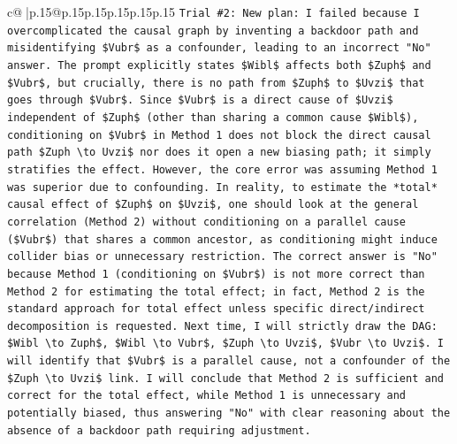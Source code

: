 \documentclass{article}
\begin{document}
{\begin{supertabular}{c@{$\;$}|p{.15\linewidth}@{}p{.15\linewidth}p{.15\linewidth}p{.15\linewidth}p{.15\linewidth}p{.15\linewidth}}
{{{\texttt{Trial \#2: New plan: I failed because I overcomplicated the causal graph by inventing a backdoor path and misidentifying \$Vubr\$ as a confounder, leading to an incorrect "No" answer. The prompt explicitly states \$Wibl\$ affects both \$Zuph\$ and \$Vubr\$, but crucially, there is no path from \$Zuph\$ to \$Uvzi\$ that goes through \$Vubr\$. Since \$Vubr\$ is a direct cause of \$Uvzi\$ independent of \$Zuph\$ (other than sharing a common cause \$Wibl\$), conditioning on \$Vubr\$ in Method 1 does not block the direct causal path \$Zuph \textbackslash{}to Uvzi\$ nor does it open a new biasing path; it simply stratifies the effect. However, the core error was assuming Method 1 was superior due to confounding. In reality, to estimate the *total* causal effect of \$Zuph\$ on \$Uvzi\$, one should look at the general correlation (Method 2) without conditioning on a parallel cause (\$Vubr\$) that shares a common ancestor, as conditioning might induce collider bias or unnecessary restriction. The correct answer is "No" because Method 1 (conditioning on \$Vubr\$) is not more correct than Method 2 for estimating the total effect; in fact, Method 2 is the standard approach for total effect unless specific direct/indirect decomposition is requested. Next time, I will strictly draw the DAG: \$Wibl \textbackslash{}to Zuph\$, \$Wibl \textbackslash{}to Vubr\$, \$Zuph \textbackslash{}to Uvzi\$, \$Vubr \textbackslash{}to Uvzi\$. I will identify that \$Vubr\$ is a parallel cause, not a confounder of the \$Zuph \textbackslash{}to Uvzi\$ link. I will conclude that Method 2 is sufficient and correct for the total effect, while Method 1 is unnecessary and potentially biased, thus answering "No" with clear reasoning about the absence of a backdoor path requiring adjustment.} \\
\\ 
}}}
\end{supertabular}}
\end{document}
